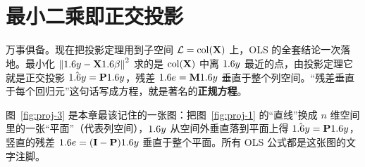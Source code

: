 \section{最小二乘即正交投影}
\label{sec:proj-ols}

万事俱备。现在把投影定理用到子空间 $\mathcal{L}=\mathrm{col}(\mathbf{X})$ 上，OLS 的全套结论一次落地。最小化 $\left\|1.6 y-\mathbf{X}1.6\beta\right\|_{}^2$ 求的是 $\mathrm{col}(\mathbf{X})$ 中离 $1.6 y$ 最近的点，由投影定理它就是正交投影 $\hat{1.6 y}=\mathbf{P}1.6 y$，残差 $1.6 e=\mathbf{M}1.6 y$ 垂直于整个列空间。``残差垂直于每个回归元''这句话写成方程，就是著名的\textbf{正规方程}。



图~\ref{fig:proj-3} 是本章最该记住的一张图：把图~\ref{fig:proj-1} 的``直线''换成 $n$ 维空间里的一张``平面''（代表列空间），$1.6 y$ 从空间外垂直落到平面上得 $\hat{1.6 y}=\mathbf{P}1.6 y$，竖直的残差 $1.6 e=(\mathbf{I}-\mathbf{P})1.6 y$ 垂直于整个平面。所有 OLS 公式都是这张图的文字注脚。

